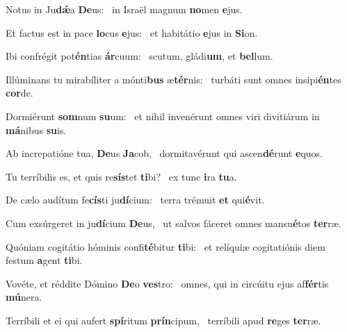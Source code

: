 \item Notus in Ju\textbf{dǽ}a \textbf{De}us:~\psstar{} in Israël magnum \textbf{no}men \textbf{e}jus.
\item Et factus est in pace \textbf{lo}cus \textbf{e}jus:~\psstar{} et habitátio \textbf{e}jus in \textbf{Si}on.
\item Ibi confrégit pot\textbf{én}tias \textbf{ár}cuum:~\psstar{} scutum, gládi\textbf{um}, et \textbf{bel}lum.
\item Illúminans tu mirabíliter a mónti\textbf{bus} æ\textbf{tér}nis:~\psstar{} turbáti sunt omnes insipi\textbf{én}tes \textbf{cor}de.
\item Dormiérunt \textbf{som}num \textbf{su}um:~\psstar{} et nihil invenérunt omnes viri divitiárum in \textbf{má}nibus \textbf{su}is.
\item Ab increpatióne tua, \textbf{De}us \textbf{Ja}cob,~\psstar{} dormitavérunt qui ascen\textbf{dé}runt \textbf{e}quos.
\item Tu terríbilis es, et quis re\textbf{sís}tet \textbf{ti}bi?~\psstar{} ex tunc \textbf{i}ra \textbf{tu}a.
\item De cælo audítum fe\textbf{cís}ti ju\textbf{dí}cium:~\psstar{} terra trémuit \textbf{et} qui\textbf{é}vit.
\item Cum exsúrgeret in ju\textbf{dí}cium \textbf{De}us,~\psstar{} ut salvos fáceret omnes mansu\textbf{é}tos \textbf{ter}ræ.
\item Quóniam cogitátio hóminis confi\textbf{té}bitur \textbf{ti}bi:~\psstar{} et relíquiæ cogitatiónis diem festum \textbf{a}gent \textbf{ti}bi.
\item Vovéte, et réddite Dómino \textbf{De}o \textbf{ves}tro:~\psstar{} omnes, qui in circúitu ejus af\textbf{fér}tis \textbf{mú}nera.
\item Terríbili et ei qui aufert \textbf{spí}ritum \textbf{prín}cipum,~\psstar{} terríbili apud \textbf{re}ges \textbf{ter}ræ.
